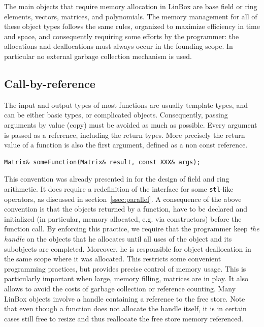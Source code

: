 \documentclass{article}
\newcommand{\linbox}{{\sc LinBox}\xspace}
\begin{document}
The main objects that require memory allocation in \linbox are base field or
ring elements, vectors, matrices, and polynomials.
The memory management for all of these object types follows the same
rules, organized to maximize efficiency in time and space, and
consequently requiring some efforts by the programmer: the allocations
and deallocations must always occur in the founding scope.
In particular
no external garbage collection mechanism is used.
\subsection{Call-by-reference}

The input and output types of most functions are usually template
types, and can be either basic types, or complicated
objects. Consequently, passing arguments by value (copy) must be avoided as
much as possible. Every argument is passed as a reference, including
the return types. More precisely the return value of a function is
also the first argument, defined as a non const reference. 
\begin{verbatim}
Matrix& someFunction(Matrix& result, const XXX& args);
\end{verbatim}
This convention was already presented in \cite[\S 2.1]{jgd:2002:icms} for the
design of field and ring arithmetic. It does require a redefinition of the interface
for some \texttt{stl}-like operators, as discussed in
section~\ref{ssec:parallel}.
%
A consequence of the above convention is that the objects returned by
a function,
have to be declared and initialized (in particular, memory allocated, e.g. via constructors) before the
function call.
By enforcing this
practice, we require that the programmer keep 
\textit{the handle} on the
objects that he allocates until all uses of the object and its subobjects are completed. Moreover, he is responsible for object 
deallocation in the same 
scope where it was allocated. 
This restricts some convenient programming practices, but provides precise control of memory usage.
This is particularly important when large, memory filling, matrices
are in play.
It also allows to avoid the costs of garbage 
collection or reference counting.
%
Many \linbox objects involve a handle containing a reference to the free store.
Note that even though a function does not allocate the handle itself,
it is in certain cases still free to resize and thus reallocate the free store memory referenced.
\end{document}

